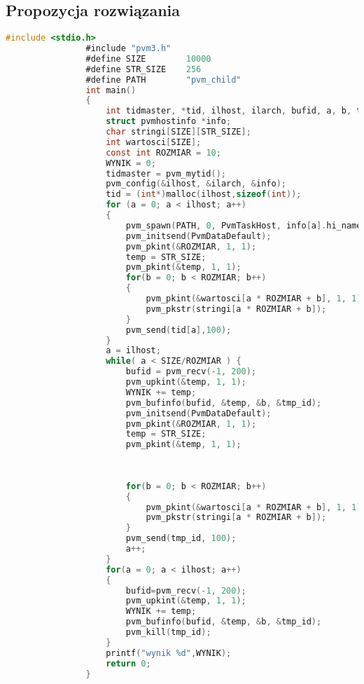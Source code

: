 		\subsection{Propozycja rozwiązania}
			\begin{lstlisting}[language=C]
				#include <stdio.h>
				#include "pvm3.h"
				#define SIZE        10000
				#define STR_SIZE    256
				#define PATH        "pvm_child"
				int main()
				{
					int tidmaster, *tid, ilhost, ilarch, bufid, a, b, temp, wynik;
					struct pvmhostinfo *info;
					char stringi[SIZE][STR_SIZE];
					int wartosci[SIZE];
					const int ROZMIAR = 10;
					WYNIK = 0;
					tidmaster = pvm_mytid();
					pvm_config(&ilhost, &ilarch, &info);
					tid = (int*)malloc(ilhost,sizeof(int));
					for (a = 0; a < ilhost; a++)
					{
						pvm_spawn(PATH, 0, PvmTaskHost, info[a].hi_name, 1, &tid[a]);
						pvm_initsend(PvmDataDefault);
						pvm_pkint(&ROZMIAR, 1, 1);
						temp = STR_SIZE;
						pvm_pkint(&temp, 1, 1);
						for(b = 0; b < ROZMIAR; b++)
						{
							pvm_pkint(&wartosci[a * ROZMIAR + b], 1, 1);
							pvm_pkstr(stringi[a * ROZMIAR + b]);
						}
						pvm_send(tid[a],100);
					}
					a = ilhost;
					while( a < SIZE/ROZMIAR ) {
						bufid = pvm_recv(-1, 200);
						pvm_upkint(&temp, 1, 1);
						WYNIK += temp;
						pvm_bufinfo(bufid, &temp, &b, &tmp_id);
						pvm_initsend(PvmDataDefault);
						pvm_pkint(&ROZMIAR, 1, 1);
						temp = STR_SIZE;
						pvm_pkint(&temp, 1, 1);
						
						
						
						for(b = 0; b < ROZMIAR; b++)
						{
							pvm_pkint(&wartosci[a * ROZMIAR + b], 1, 1);
							pvm_pkstr(stringi[a * ROZMIAR + b]);
						}
						pvm_send(tmp_id, 100);
						a++;
					}
					for(a = 0; a < ilhost; a++)
					{
						bufid=pvm_recv(-1, 200);
						pvm_upkint(&temp, 1, 1);
						WYNIK += temp;
						pvm_bufinfo(bufid, &temp, &b, &tmp_id);
						pvm_kill(tmp_id);
					}
					printf("wynik %d",WYNIK);
					return 0;
				}
			\end{lstlisting}
	
			